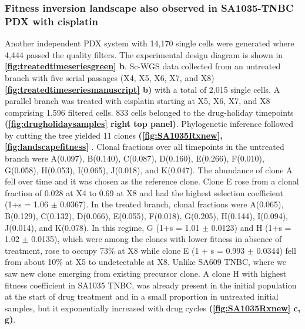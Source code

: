 \subsubsection{Fitness inversion landscape also observed in SA1035-TNBC PDX with cisplatin}
Another independent PDX system with 14,170 single cells were generated where 4,444 passed the quality filters. The experimental design diagram is shown in \textbf{\autoref{fig:treatedtimeseriesgreen} b}.
Sc-WGS data collected from an untreated branch with five serial passages (X4, X5, X6, X7, and X8) \textbf{\autoref{fig:treatedtimeseriesmanuscript} b)} with a total of 2,015 single cells. A parallel branch was treated with cisplatin starting at X5, X6, X7, and X8 comprising 1,596 filtered cells. 833 cells belonged to the drug-holiday timepoints \textbf{(\autoref{fig:drugholidaysamples} right top panel)}. Phylogenetic inference followed by cutting the tree yielded 11 clones \textbf{(\autoref{fig:SA1035Rxnew}, \autoref{fig:landscapefitness}} . Clonal fractions over all timepoints in the untreated branch were A(0.097), B(0.140), C(0.087), D(0.160), E(0.266), F(0.010), G(0.058), H(0.053), I(0.065), J(0.018), and K(0.047). The abundance of clone A fell over time and it was chosen as the reference clone. Clone E rose from a clonal fraction of 0.028 at X4 to 0.69 at X8 and had the highest selection coefficient (1+s = 1.06 $\pm$ 0.0367). In the treated branch, clonal fractions were A(0.065), B(0.129), C(0.132), D(0.066), E(0.055), F(0.018), G(0.205), H(0.144), I(0.094), J(0.014), and K(0.078). In this regime, G (1+s = 1.01 $\pm$ 0.0123) and H (1+s = 1.02 $\pm$ 0.0135), which were among the clones with lower fitness in absence of treatment, rose to occupy 73\% at X8 while clone E (1 + s = 0.993 $\pm$ 0.0344) fell from about 10\% at X5 to undetectable at X8. Unlike SA609 TNBC, where we saw new clone emerging from existing precursor clone. A clone H with highest fitness coefficient in SA1035 TNBC, was already present in the initial population at the start of drug treatment and in a small proportion in untreated initial samples, but it exponentially increased with drug cycles \textbf{(\autoref{fig:SA1035Rxnew} c, g)}. 

